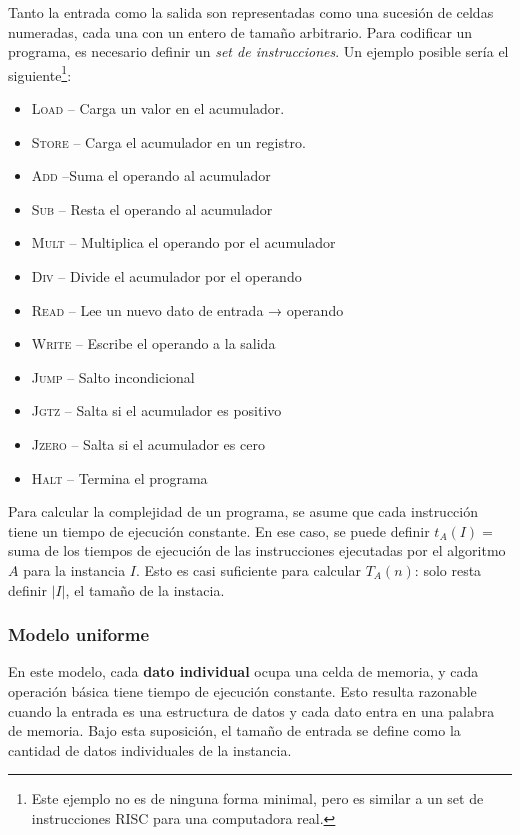 Tanto la entrada como la salida son representadas como una sucesión de celdas numeradas, cada una con un entero de tamaño arbitrario. Para codificar un programa, es necesario definir un \textit{set de instrucciones}. Un ejemplo posible sería el siguiente\footnote{Este ejemplo no es de ninguna forma minimal, pero es similar a un set de instrucciones RISC para una computadora real.}:
\begin{itemize}
    \item \textsc{Load}  -- Carga un valor en el acumulador.
    \item \textsc{Store}  -- Carga el acumulador en un registro.
    \item \textsc{Add}  --Suma el operando al acumulador
    \item \textsc{Sub}  -- Resta el operando al acumulador
    \item \textsc{Mult}  -- Multiplica el operando por el acumulador
    \item \textsc{Div}  -- Divide el acumulador por el operando
    \item \textsc{Read}  -- Lee un nuevo dato de entrada → operando
    \item \textsc{Write}  -- Escribe el operando a la salida
    \item \textsc{Jump}  -- Salto incondicional
    \item \textsc{Jgtz}  -- Salta si el acumulador es positivo
    \item \textsc{Jzero}  -- Salta si el acumulador es cero
    \item \textsc{Halt} -- Termina el programa
\end{itemize}

Para calcular la complejidad de un programa, se asume que cada instrucción tiene un tiempo de ejecución constante. En ese caso, se puede definir $t_A(I) = $ suma de los tiempos de ejecución de las instrucciones ejecutadas por el algoritmo $A$ para la instancia $I$. Esto es casi suficiente para calcular $T_A(n)$: solo resta definir $|I|$, el tamaño de la instacia.

\subsubsection{Modelo uniforme}

En este modelo, cada \textbf{dato individual} ocupa una celda de memoria, y cada operación básica tiene tiempo de ejecución constante. Esto resulta razonable cuando la entrada es una estructura de datos y cada dato entra en una palabra de memoria. Bajo esta suposición, el tamaño de entrada se define como la cantidad de datos individuales de la instancia.

